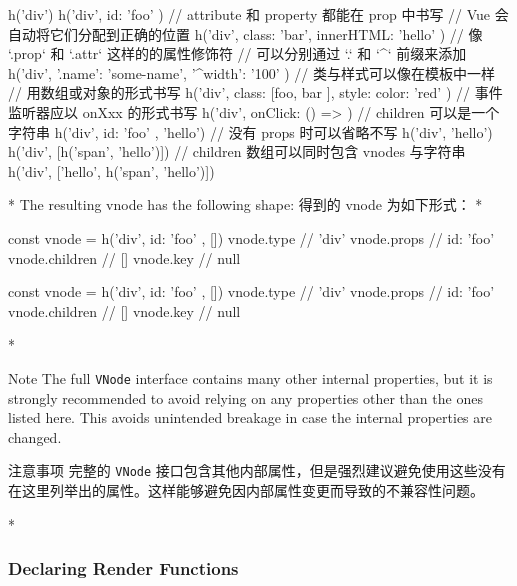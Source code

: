 \begin{paracol}{2}
\begin{codeJs}
h('div')
h('div', { id: 'foo' })
// attribute 和 property 都能在 prop 中书写
// Vue 会自动将它们分配到正确的位置
h('div', { class: 'bar', innerHTML: 'hello' })
// 像 `.prop` 和 `.attr` 这样的的属性修饰符
// 可以分别通过 `.` 和 `^` 前缀来添加
h('div', { '.name': 'some-name', '^width': '100' })
// 类与样式可以像在模板中一样
// 用数组或对象的形式书写
h('div', { class: [foo, { bar }], style: { color: 'red' } })
// 事件监听器应以 onXxx 的形式书写
h('div', { onClick: () => {} })
// children 可以是一个字符串
h('div', { id: 'foo' }, 'hello')
// 没有 props 时可以省略不写
h('div', 'hello')
h('div', [h('span', 'hello')])
// children 数组可以同时包含 vnodes 与字符串
h('div', ['hello', h('span', 'hello')])
\end{codeJs}
\switchcolumn[0]*%
The resulting vnode has the following shape:
\switchcolumn
得到的 vnode 为如下形式：
\switchcolumn[0]*%
\begin{codeJs}
const vnode = h('div', { id: 'foo' }, [])
vnode.type // 'div'
vnode.props // { id: 'foo' }
vnode.children // []
vnode.key // null
\end{codeJs}
\switchcolumn
\begin{codeJs}
const vnode = h('div', { id: 'foo' }, [])
vnode.type // 'div'
vnode.props // { id: 'foo' }
vnode.children // []
vnode.key // null
\end{codeJs}
\switchcolumn[0]*%
\begin{vueQuoteWarn}{Note}
The full \texttt{VNode} interface contains many other internal
properties, but it is strongly recommended to avoid relying on any
properties other than the ones listed here. This avoids unintended
breakage in case the internal properties are changed.
\end{vueQuoteWarn}
\switchcolumn
\begin{vueQuoteWarn}{注意事项}
完整的 \texttt{VNode}
接口包含其他内部属性，但是强烈建议避免使用这些没有在这里列举出的属性。这样能够避免因内部属性变更而导致的不兼容性问题。
\end{vueQuoteWarn}
\switchcolumn[0]*%
\subsubsection{Declaring Render Functions}
\switchcolumn

\end{paracol}
